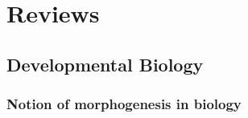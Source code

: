 \documentclass[fleqn,10pt]{wlscirep}
\begin{document}
\section*{Reviews}


% 
%
\subsection*{Developmental Biology}
\subsubsection*{Notion of morphogenesis in biology}
\end{document}
